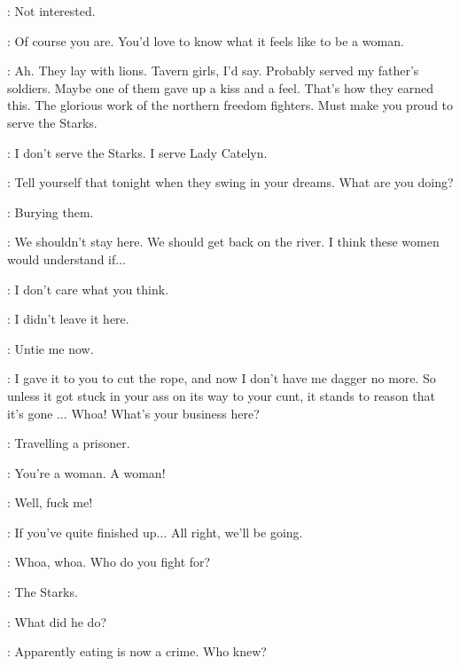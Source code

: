\BRIENNE: Not interested. 

\JAIME: Of course you are. You'd love to know what it feels like to be a woman.


\JAIME: Ah. They lay with lions. Tavern girls, I'd say. Probably served my father's soldiers. Maybe one of them gave up a kiss and a feel. That's how they earned this. The glorious work of the northern freedom fighters. Must make you proud to serve the Starks. 

\BRIENNE: I don't serve the Starks. I serve Lady Catelyn. 

\JAIME: Tell yourself that tonight when they swing in your dreams. What are you doing? 


\BRIENNE: Burying them. 

\JAIME: We shouldn't stay here. We should get back on the river. I think these women would understand if$\ldots$  

\BRIENNE:  I don't care what you think. 

\STARKSOLDIERa:  I didn't leave it here. 

\JAIME:  Untie me now. 

\STARKSOLDIERa:  I gave it to you to cut the rope, and
now I don't have me dagger no more. So unless it got stuck in your ass
on its way to your cunt, it stands to reason that it's gone
$\ldots$  Whoa! What's your
business here?

\BRIENNE: Travelling a prisoner. 

\STARKSOLDIERa:  You're a woman. A woman!

\STARKSOLDIERb: Well, fuck me! 

\BRIENNE: If you've quite finished up$\ldots$  All right, we'll be going.  

\STARKSOLDIERa: Whoa, whoa. Who do you fight for? 

\BRIENNE: The Starks.  

\STARKSOLDIERb: What did he do? 

\JAIME:  Apparently eating is now a crime. Who knew? 

